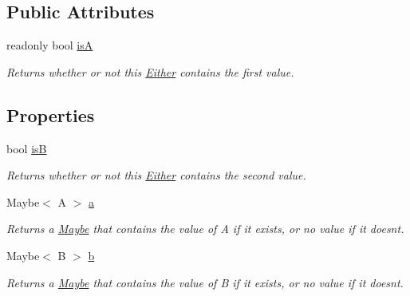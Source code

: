 \subsection*{Public Attributes}
\begin{DoxyCompactItemize}
\item 
readonly bool \mbox{\hyperlink{struct_leap_1_1_unity_1_1_either_a40ac2be2f7b6cf84befee547151bab6f}{isA}}
\begin{DoxyCompactList}\small\item\em Returns whether or not this \mbox{\hyperlink{struct_leap_1_1_unity_1_1_either}{Either}} contains the first value. \end{DoxyCompactList}\end{DoxyCompactItemize}
\subsection*{Properties}
\begin{DoxyCompactItemize}
\item 
bool \mbox{\hyperlink{struct_leap_1_1_unity_1_1_either_a66c31b6f54097c6a442888bad3aa8b01}{isB}}
\begin{DoxyCompactList}\small\item\em Returns whether or not this \mbox{\hyperlink{struct_leap_1_1_unity_1_1_either}{Either}} contains the second value. \end{DoxyCompactList}\item 
Maybe$<$ A $>$ \mbox{\hyperlink{struct_leap_1_1_unity_1_1_either_ac7c612037b34bbfb23251111dae09928}{a}}
\begin{DoxyCompactList}\small\item\em Returns a \mbox{\hyperlink{struct_leap_1_1_unity_1_1_maybe}{Maybe}} that contains the value of A if it exists, or no value if it doesn\textquotesingle{}t. \end{DoxyCompactList}\item 
Maybe$<$ B $>$ \mbox{\hyperlink{struct_leap_1_1_unity_1_1_either_aaa579850040ea7c13ab798269e23fd0c}{b}}
\begin{DoxyCompactList}\small\item\em Returns a \mbox{\hyperlink{struct_leap_1_1_unity_1_1_maybe}{Maybe}} that contains the value of B if it exists, or no value if it doesn\textquotesingle{}t. \end{DoxyCompactList}\end{DoxyCompactItemize}


